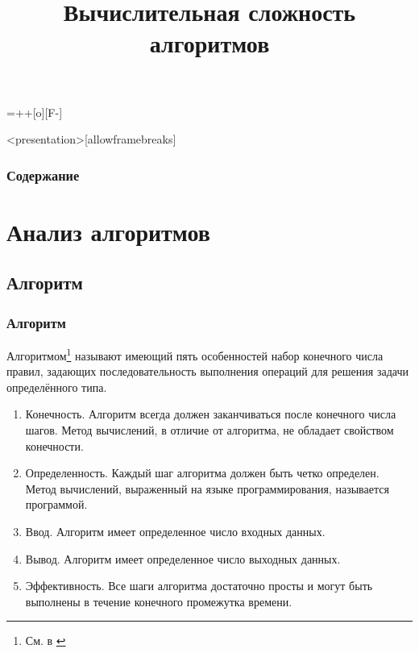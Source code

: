 

\usepackage{algorithm}
\usepackage{algorithmic}
\usepackage[all]{xy}

\entrymodifiers={++[o][F-]}

\renewcommand{\algorithmicrequire}{\textbf{Вход:}}
\renewcommand{\algorithmicensure}{\textbf{Выход:}}
\renewcommand{\algorithmiccomment}[1]{// #1}


\title[Математические основы криптографии]{Вычислительная сложность алгоритмов}







\begin{frame}<presentation>[allowframebreaks]
    \frametitle{Содержание}
    
    \tableofcontents
\end{frame}


\section{Анализ алгоритмов}


\subsection{Алгоритм}


\begin{frame}
    \frametitle{Алгоритм}
    
    \alert{Алгоритмом}\footnote{См. в \cite{bib:knuth:artOfProgramming2}} называют имеющий \alert{пять} особенностей набор конечного числа правил, задающих последовательность выполнения операций для решения задачи определённого типа.
    \begin{enumerate}
        \item \alert{Конечность}. Алгоритм всегда должен заканчиваться после конечного числа шагов. \alert{Метод вычислений}, в отличие от алгоритма, не обладает свойством конечности.
        
        \item \alert{Определенность}. Каждый шаг алгоритма должен быть четко определен. \alert{Метод} вычислений, выраженный на языке программирования, называется \alert{программой}.
        
        \item \alert{Ввод}. Алгоритм имеет определенное число входных данных.
        
        \item \alert{Вывод}. Алгоритм имеет определенное число выходных данных.
        
        \item \alert{Эффективность}. Все шаги алгоритма достаточно просты и могут быть выполнены в течение конечного промежутка времени.
    \end{enumerate}
\end{frame}

